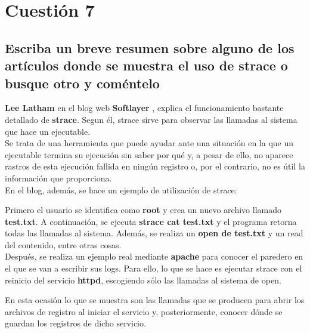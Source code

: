 \newpage


\section{Cuestión 7}
\subsection{Escriba un breve resumen sobre alguno de los artículos donde
	se muestra el uso de strace o busque otro y coméntelo}

\textbf{Lee Latham} en el blog web \textbf{Softlayer} \cite{enlace8}, explica el funcionamiento bastante detallado de \textbf{strace}. Segun él, strace sirve para observar las llamadas al sistema que hace un ejecutable. 
\\

Se trata de una herramienta que puede ayudar ante una situación en la que un ejecutable termina su ejecución sin saber por qué y, a pesar de ello, no aparece rastros de esta ejecución fallida en ningún registro o, por el contrario, no es útil la información que proporciona.
\\

En el blog, además, se hace un ejemplo de utilización de strace: 

Primero el usuario se identifica como \textbf{root} y crea un nuevo archivo llamado \textbf{test.txt}.
A continuación, se ejecuta \textbf{strace cat test.txt} y el programa retorna todas las llamadas al sistema. Además, se realiza un \textbf{open de test.txt} y un read del contenido, entre otras cosas.
\\

Después, se realiza un ejemplo real mediante \textbf{apache} para conocer el paredero en el que se van a escribir sus logs.
Para ello, lo que se hace es ejecutar strace con el reinicio del servicio \textbf{httpd}, escogiendo sólo las llamadas
al sistema de open.

En esta ocasión lo que se muestra son las llamadas que se producen para abrir los archivos de registro al iniciar el servicio y, posteriormente, conocer dónde se guardan los registros de dicho servicio.

\newpage


